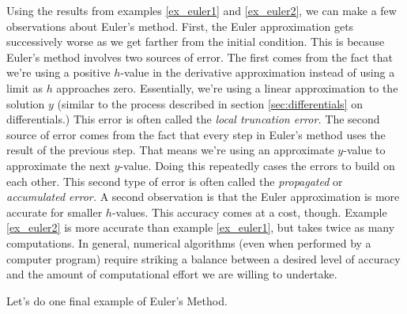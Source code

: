 Using the results from examples \ref{ex_euler1} and \ref{ex_euler2}, we can make a few observations about Euler's method.  First, the Euler approximation gets successively worse as we get farther from the initial condition.  This is because Euler's method involves two sources of error.  The first comes from the fact that we're using a positive $h$-value in the derivative approximation instead of using a limit as $h$ approaches zero.  Essentially, we're using a linear approximation to the solution $y$ (similar to the process described in section \ref{sec:differentials} on differentials.) This error is often called the \emph{local truncation error.}  The second source of error comes from the fact that every step in Euler's method uses the result of the previous step.  That means we're using an approximate $y$-value to approximate the next $y$-value.  Doing this repeatedly cases the errors to build on each other.  This second type of error is often called the \emph{propagated} or \emph{accumulated error.} A second observation is that the Euler approximation is more accurate for smaller $h$-values.  This accuracy comes at a cost, though.  Example \ref{ex_euler2} is more accurate than example \ref{ex_euler1}, but takes twice as many computations.  In general, numerical algorithms (even when performed by a computer program) require striking a balance between a desired level of accuracy and the amount of computational effort we are willing to undertake.

Let's do one final example of Euler's Method.\\

